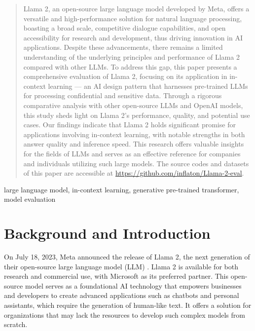 \documentclass[conference]{IEEEtran}
\begin{document}
\begin{abstract}
Llama 2, an open-source large language model developed by Meta, offers a versatile and high-performance solution for natural language processing, boasting a broad scale, competitive dialogue capabilities, and open accessibility for research and development, thus driving innovation in AI applications. Despite these advancements, there remains a limited understanding of the underlying principles and performance of Llama 2 compared with other LLMs. To address this gap, this paper presents a comprehensive evaluation of Llama 2, focusing on its application in in-context learning — an AI design pattern that harnesses pre-trained LLMs for processing confidential and sensitive data. Through a rigorous comparative analysis with other open-source LLMs and OpenAI models, this study sheds light on Llama 2's performance, quality, and potential use cases. Our findings indicate that Llama 2 holds significant promise for applications involving in-context learning, with notable strengths in both answer quality and inference speed.
This research offers valuable insights for the fields of LLMs and serves as an effective reference for companies and individuals utilizing such large models.
The source codes and datasets of this paper are accessible at \url{https://github.com/inflaton/Llama-2-eval}.
\end{abstract}

\begin{IEEEkeywords}
large language model, in-context learning, generative pre-trained transformer, model evaluation
\end{IEEEkeywords}

\section{Background and Introduction}
On July 18, 2023, Meta announced the release of Llama 2, the next generation of their open-source large language model (LLM) \cite{touvron2023llama}. Llama 2 is available for both research and commercial use, with Microsoft as its preferred partner. This open-source model serves as a foundational AI technology that empowers businesses and developers to create advanced applications such as chatbots and personal assistants, which require the generation of human-like text. It offers a solution for organizations that may lack the resources to develop such complex models from scratch.
\end{document}

